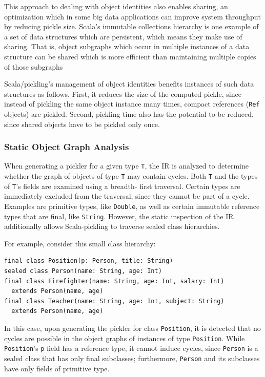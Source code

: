 \documentclass[10pt]{sigplanconf}
\theoremstyle{definition}
\theoremstyle{definition}
\begin{document}
This approach to dealing with object identities also enables sharing, an
optimization which in some big data applications can improve system throughput
by reducing pickle size. Scala's immutable collections hierarchy is one
example of a set of data structures which are persistent, which means they
make use of sharing. That is, object subgraphs which occur in multiple
instances of a data structure can be shared which is more efficient than
maintaining multiple copies of those subgraphs

Scala/pickling's management of object identities benefits instances of such
data structures as follows. First, it reduces the size of the computed pickle,
since instead of pickling the same object instance many times, compact
references (\verb|Ref| objects) are pickled. Second, pickling time also has
the potential to be reduced, since shared objects have to be pickled only
once.

\subsubsection{Static Object Graph Analysis}
\label{sec:object-graph-analysis}

When generating a pickler for a given type \verb|T|, the IR is analyzed to
determine whether the graph of objects of type \verb|T| may contain cycles.
Both \verb|T| and the types of \verb|T|'s fields are examined using a breadth-
first traversal. Certain types are immediately excluded from the traversal,
since they cannot be part of a cycle. Examples are primitive types, like
\verb|Double|, as well as certain immutable reference types that are final,
like \verb|String|. However, the static inspection of the IR additionally
allows Scala-pickling to traverse sealed class hierarchies.

For example, consider this small class hierarchy:

\begin{lstlisting}
final class Position(p: Person, title: String)
sealed class Person(name: String, age: Int)
final class Firefighter(name: String, age: Int, salary: Int)
  extends Person(name, age)
final class Teacher(name: String, age: Int, subject: String)
  extends Person(name, age)
\end{lstlisting}

In this case, upon generating the pickler for class \verb|Position|, it is
detected that no cycles are possible in the object graphs of instances of type
\verb|Position|. While \verb|Position|'s \verb|p| field has a reference type,
it cannot induce cycles, since \verb|Person| is a sealed class that has only
final subclasses; furthermore, \verb|Person| and its subclasses have only
fields of primitive type.
\end{document}
